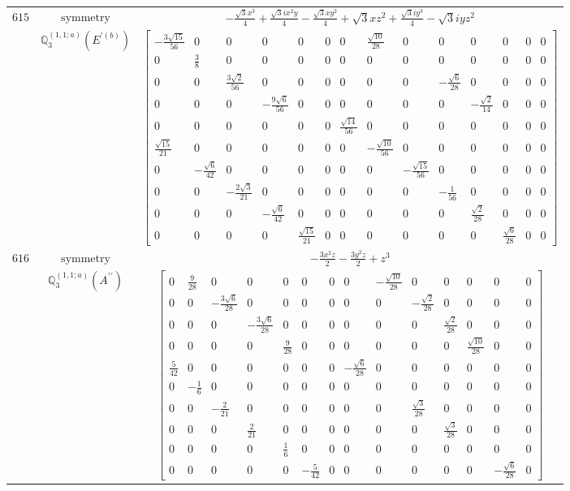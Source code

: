\documentclass[fleqn,8pt,landscape]{jsarticle}
\begin{document}
\begin{longtable}{ccc}
$ 615 $ & $ \text{symmetry} $ & $ - \frac{\sqrt{3} x^{3}}{4} + \frac{\sqrt{3} i x^{2} y}{4} - \frac{\sqrt{3} x y^{2}}{4} + \sqrt{3} x z^{2} + \frac{\sqrt{3} i y^{3}}{4} - \sqrt{3} i y z^{2} $ \\
$  $ & $ \mathbb{Q}_{3}^{(1,1;a)}(E^{\prime(b)}) $ & $ \begin{bmatrix} - \frac{3 \sqrt{15}}{56} & 0 & 0 & 0 & 0 & 0 & 0 & \frac{\sqrt{10}}{28} & 0 & 0 & 0 & 0 & 0 & 0 \\ 0 & \frac{3}{8} & 0 & 0 & 0 & 0 & 0 & 0 & 0 & 0 & 0 & 0 & 0 & 0 \\ 0 & 0 & \frac{3 \sqrt{2}}{56} & 0 & 0 & 0 & 0 & 0 & 0 & - \frac{\sqrt{6}}{28} & 0 & 0 & 0 & 0 \\ 0 & 0 & 0 & - \frac{9 \sqrt{6}}{56} & 0 & 0 & 0 & 0 & 0 & 0 & - \frac{\sqrt{2}}{14} & 0 & 0 & 0 \\ 0 & 0 & 0 & 0 & 0 & 0 & \frac{\sqrt{14}}{56} & 0 & 0 & 0 & 0 & 0 & 0 & 0 \\ \frac{\sqrt{15}}{21} & 0 & 0 & 0 & 0 & 0 & 0 & - \frac{\sqrt{10}}{56} & 0 & 0 & 0 & 0 & 0 & 0 \\ 0 & - \frac{\sqrt{6}}{42} & 0 & 0 & 0 & 0 & 0 & 0 & - \frac{\sqrt{15}}{56} & 0 & 0 & 0 & 0 & 0 \\ 0 & 0 & - \frac{2 \sqrt{3}}{21} & 0 & 0 & 0 & 0 & 0 & 0 & - \frac{1}{56} & 0 & 0 & 0 & 0 \\ 0 & 0 & 0 & - \frac{\sqrt{6}}{42} & 0 & 0 & 0 & 0 & 0 & 0 & \frac{\sqrt{2}}{28} & 0 & 0 & 0 \\ 0 & 0 & 0 & 0 & \frac{\sqrt{15}}{21} & 0 & 0 & 0 & 0 & 0 & 0 & \frac{\sqrt{6}}{28} & 0 & 0 \end{bmatrix} $ \\ \hline
$ 616 $ & $ \text{symmetry} $ & $ - \frac{3 x^{2} z}{2} - \frac{3 y^{2} z}{2} + z^{3} $ \\
$  $ & $ \mathbb{Q}_{3}^{(1,1;a)}(A^{\prime\prime}) $ & $ \begin{bmatrix} 0 & \frac{9}{28} & 0 & 0 & 0 & 0 & 0 & 0 & - \frac{\sqrt{10}}{28} & 0 & 0 & 0 & 0 & 0 \\ 0 & 0 & - \frac{3 \sqrt{6}}{28} & 0 & 0 & 0 & 0 & 0 & 0 & - \frac{\sqrt{2}}{28} & 0 & 0 & 0 & 0 \\ 0 & 0 & 0 & - \frac{3 \sqrt{6}}{28} & 0 & 0 & 0 & 0 & 0 & 0 & \frac{\sqrt{2}}{28} & 0 & 0 & 0 \\ 0 & 0 & 0 & 0 & \frac{9}{28} & 0 & 0 & 0 & 0 & 0 & 0 & \frac{\sqrt{10}}{28} & 0 & 0 \\ \frac{5}{42} & 0 & 0 & 0 & 0 & 0 & 0 & - \frac{\sqrt{6}}{28} & 0 & 0 & 0 & 0 & 0 & 0 \\ 0 & - \frac{1}{6} & 0 & 0 & 0 & 0 & 0 & 0 & 0 & 0 & 0 & 0 & 0 & 0 \\ 0 & 0 & - \frac{2}{21} & 0 & 0 & 0 & 0 & 0 & 0 & \frac{\sqrt{3}}{28} & 0 & 0 & 0 & 0 \\ 0 & 0 & 0 & \frac{2}{21} & 0 & 0 & 0 & 0 & 0 & 0 & \frac{\sqrt{3}}{28} & 0 & 0 & 0 \\ 0 & 0 & 0 & 0 & \frac{1}{6} & 0 & 0 & 0 & 0 & 0 & 0 & 0 & 0 & 0 \\ 0 & 0 & 0 & 0 & 0 & - \frac{5}{42} & 0 & 0 & 0 & 0 & 0 & 0 & - \frac{\sqrt{6}}{28} & 0 \end{bmatrix} $ \\ \hline

\end{longtable}
\end{document}

